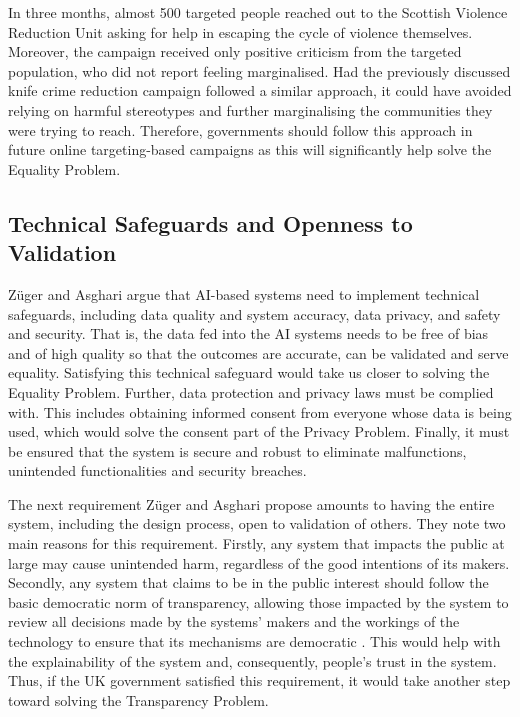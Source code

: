 \documentclass[preprint]{acmart}
\begin{document}
In three months, almost 500 targeted people reached out to the Scottish Violence Reduction Unit asking for help in escaping the cycle of violence themselves. Moreover, the campaign received only positive criticism from the targeted population, who did not report feeling marginalised. Had the previously discussed knife crime reduction campaign followed a similar approach, it could have avoided relying on harmful stereotypes and further marginalising the communities they were trying to reach. Therefore, governments should follow this approach in future online targeting-based campaigns as this will significantly help solve the Equality Problem.

\subsection{Technical Safeguards and Openness to Validation}

Züger and Asghari \cite{zuger2022} argue that AI-based systems need to implement technical safeguards, including data quality and system accuracy, data privacy, and safety and security. That is, the data fed into the AI systems needs to be free of bias and of high quality so that the outcomes are accurate, can be validated and serve equality. Satisfying this technical safeguard would take us closer to solving the Equality Problem. Further, data protection and privacy laws must be complied with. This includes obtaining informed consent from everyone whose data is being used, which would solve the consent part of the Privacy Problem. Finally, it must be ensured that the system is secure and robust to eliminate malfunctions, unintended functionalities and security breaches.

The next requirement Züger and Asghari \cite{zuger2022} propose amounts to having the entire system, including the design process, open to validation of others. They note two main reasons for this requirement. Firstly, any system that impacts the public at large may cause unintended harm, regardless of the good intentions of its makers. Secondly, any system that claims to be in the public interest should follow the basic democratic norm of transparency, allowing those impacted by the system to review all decisions made by the systems' makers and the workings of the technology to ensure that its mechanisms are democratic \cite{zuger2022}. This would help with the explainability of the system and, consequently, people's trust in the system. Thus, if the UK government satisfied this requirement, it would take another step toward solving the Transparency Problem. 
\end{document}

